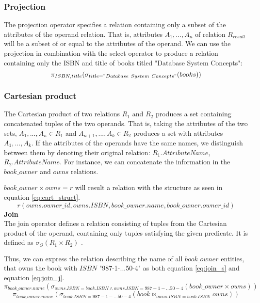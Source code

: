 \subsubsection*{Projection}
The projection operator specifies a relation containing only a subset of the attributes of the operand relation\cite{DBSBook}.
That is, attributes $A_1, ..., A_n$ of relation $R_{result}$ will be a subset of or equal to the attributes of the operand.
We can use the projection in combination with the select operator to produce a relation containing only the ISBN and title of books titled "Database System Concepts":
$$\pi_{ISBN,title} (\sigma_{title = "Database\ System\ Concepts"}(books))$$
\subsubsection*{Cartesian product}
The Cartesian product of two relations $R_1$ and $R_2$ produces a set containing concatenated tuples of the two operands.
That is, taking the attributes of the two sets, $A_1,...,A_n \in R_1$ and $A_{n+1},...,A_k \in R_2$ produces a set with attributes $A_1,...,A_k$.
If the attributes of the operands have the same names, we distinguish between them by denoting their original relation: $R_1.AttributeName$, $R_2.AttributeName$. \cite{DBSBook}
For instance, we can concatenate the information in the $book\_owner$ and $owns$ relations.

$book\_owner \times owns = r$ will result a relation with the structure as seen in equation \ref{eq:cart_struct}.
\begin{equation}\label{eq:cart_struct}
    r(owns.owner\_id, owns.ISBN,book\_owner.name,book\_owner.owner\_id)
\end{equation}
\textbf{Join}\\
The join operator defines a relation consisting of tuples from the Cartesian product of the operand, containing only tuples satisfying the given predicate.
It is defined as $\sigma_{\Theta} (R_1 \times R_2)$ \cite{DBSBook}.

Thus, we can express the relation describing the name of all $book\_owner$ entities, that owns the book with $ISBN$ "987-1-...50-4" as both equation \ref{eq:join_s} and equation \ref{eq:join_j}.
\begin{equation}\label{eq:join_s}
    \pi_{book\_owner.name} (\sigma_{owns.ISBN = book.ISBN \wedge owns.ISBN = 987-1-...50-4}  (book\_owner \times owns))
\end{equation}
\begin{equation}\label{eq:join_j}
    \pi_{book\_owner.name} (\sigma_{book.ISBN = 987-1-...50-4} (book \Join_{owns.ISBN = book.ISBN} owns))
\end{equation}\\


